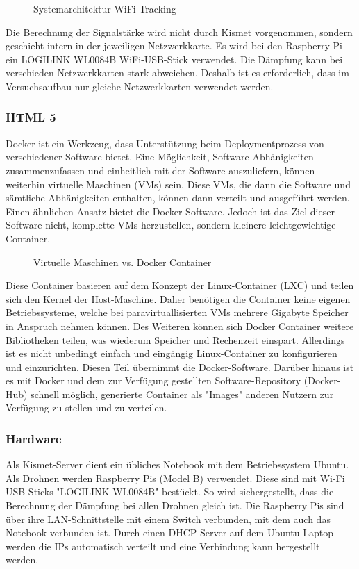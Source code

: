 \documentclass[a4paper]{spie}  %
\begin{document}
\begin{figure}[h!]
	\centering
		\caption{Systemarchitektur WiFi Tracking}
		\label{fig:sysArch}
\end{figure}

Die Berechnung der Signalstärke wird nicht durch Kismet vorgenommen, sondern geschieht intern in der jeweiligen Netzwerkkarte. Es wird bei den Raspberry Pi ein LOGILINK WL0084B WiFi-USB-Stick verwendet. Die Dämpfung kann bei verschieden Netzwerkkarten stark abweichen. Deshalb ist es erforderlich, dass im Versuchsaufbau nur gleiche Netzwerkkarten verwendet werden.

\subsubsection{HTML 5}
Docker ist ein Werkzeug, dass Unterstützung beim Deploymentprozess von verschiedener Software bietet. Eine Möglichkeit, Software-Abhänigkeiten zusammenzufassen und einheitlich mit der Software auszuliefern, können weiterhin virtuelle Maschinen (VMs) sein. Diese VMs, die dann die Software und sämtliche Abhänigkeiten enthalten, können dann verteilt und ausgeführt werden. Einen ähnlichen Ansatz bietet die Docker Software. Jedoch ist das Ziel dieser Software nicht, komplette VMs herzustellen, sondern kleinere leichtgewichtige Container.

\begin{figure}[h!]
	\centering
		\caption{Virtuelle Maschinen vs. Docker Container\cite{dockercontainer}}
		\label{fig:dockerVM}
\end{figure}

Diese Container basieren auf dem Konzept der Linux-Container (LXC) und teilen sich den Kernel der Host-Maschine. Daher benötigen die Container keine eigenen Betriebssysteme, welche bei paravirtuallisierten VMs mehrere Gigabyte Speicher in Anspruch nehmen können. Des Weiteren können sich Docker Container weitere Bibliotheken teilen, was wiederum Speicher und Rechenzeit einspart. Allerdings ist es nicht unbedingt einfach und eingängig Linux-Container zu konfigurieren und einzurichten. Diesen Teil übernimmt die Docker-Software. Darüber hinaus ist es mit Docker und dem zur Verfügung gestellten Software-Repository (Docker-Hub) schnell möglich, generierte Container als "Images" anderen Nutzern zur Verfügung zu stellen und zu verteilen.

\subsubsection{Hardware}
Als Kismet-Server dient ein übliches Notebook mit dem Betriebssystem Ubuntu. Als Drohnen werden Raspberry Pis (Model B) verwendet. Diese sind mit Wi-Fi USB-Sticks "LOGILINK WL0084B" bestückt. So wird sichergestellt, dass die Berechnung der Dämpfung bei allen Drohnen gleich ist.
Die Raspberry Pis sind über ihre LAN-Schnittstelle mit einem Switch verbunden, mit dem auch das Notebook verbunden ist. Durch einen DHCP Server auf dem Ubuntu Laptop werden die IPs automatisch verteilt und eine Verbindung kann hergestellt werden.
\end{document}
